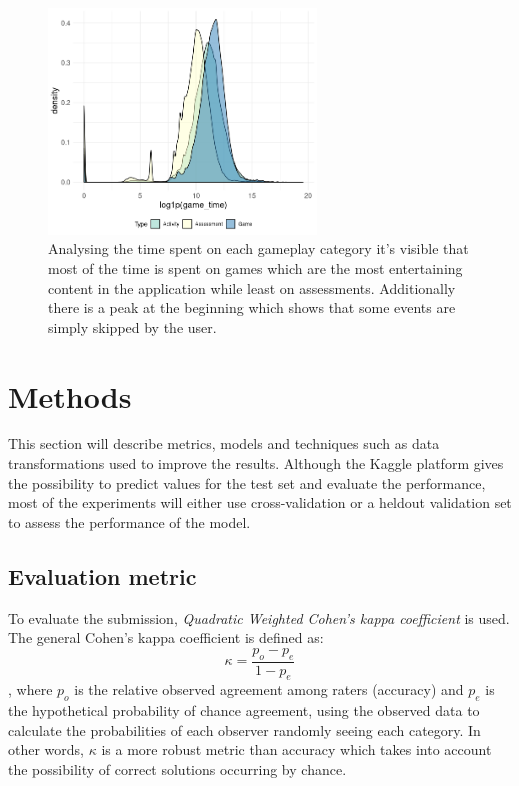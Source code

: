\documentclass[fleqn,10pt]{SelfArx} %
\begin{document}
\begin{figure}
    \centering
    \includegraphics[width=\linewidth,height=6cm]{images/activity_time.png}
    \caption{Analysing the time spent on each gameplay category it's visible that most of the time is spent on games which are the most entertaining content in the application while least on assessments. Additionally there is a peak at the beginning which shows that some events are simply skipped by the user.}
    \label{fig:activity-time}
\end{figure}


\section{Methods}

This section will describe metrics, models and techniques such as data transformations used to improve the results.
Although the Kaggle platform gives the possibility to predict values for the test set and evaluate the performance, most of the experiments will either use cross-validation or a heldout validation set to assess the performance of the model.

\subsection{Evaluation metric}

To evaluate the submission, \textit{Quadratic Weighted Cohen's kappa coefficient} is used.
The general Cohen's kappa coefficient is defined as:
\begin{equation}
    \kappa = \frac{p_o - p_e}{1 - p_e}
    \label{eq:kappa}
\end{equation}
, where $p_o$ is the relative observed agreement among raters (accuracy) and $p_e$ is the hypothetical probability of chance agreement, using the observed data to calculate the probabilities of each observer randomly seeing each category.
In other words, $\kappa$ is a more robust metric than accuracy which takes into account the possibility of correct solutions occurring by chance.
\end{document}
